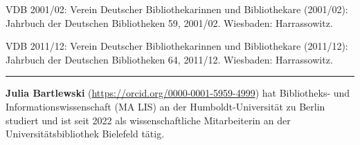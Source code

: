 \documentclass[a4paper,
fontsize=11pt,
oneside,
numbers=noperiodatend,
parskip=half-,
bibliography=totoc,
final
]{scrartcl}
\begin{document}
VDB 2001/02: Verein Deutscher Bibliothekarinnen und Bibliothekare
(2001/02): Jahrbuch der Deutschen Bibliotheken 59, 2001/02. Wiesbaden:
Harrassowitz.

VDB 2011/12: Verein Deutscher Bibliothekarinnen und Bibliothekare
(2011/12): Jahrbuch der Deutschen Bibliotheken 64, 2011/12. Wiesbaden:
Harrassowitz.

\begin{center}\rule{0.5\linewidth}{0.5pt}\end{center}

\textbf{Julia Bartlewski} (\url{https://orcid.org/0000-0001-5959-4999})
hat Bibliotheks- und Informationswissenschaft (MA LIS) an der
Humboldt-Universität zu Berlin studiert und ist seit 2022 als
wissenschaftliche Mitarbeiterin an der Universitätsbibliothek Bielefeld
tätig.
\end{document}
